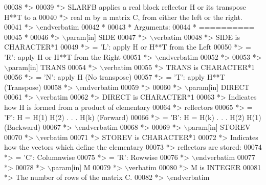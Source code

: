 \begin{DoxyCode}
00038 \textcolor{comment}{*>}
00039 \textcolor{comment}{*> SLARFB applies a real block reflector H or its transpose H**T to a}
00040 \textcolor{comment}{*> real m by n matrix C, from either the left or the right.}
00041 \textcolor{comment}{*> \(\backslash\)endverbatim}
00042 \textcolor{comment}{*}
00043 \textcolor{comment}{*  Arguments:}
00044 \textcolor{comment}{*  ==========}
00045 \textcolor{comment}{*}
00046 \textcolor{comment}{*> \(\backslash\)param[in] SIDE}
00047 \textcolor{comment}{*> \(\backslash\)verbatim}
00048 \textcolor{comment}{*>          SIDE is CHARACTER*1}
00049 \textcolor{comment}{*>          = 'L': apply H or H**T from the Left}
00050 \textcolor{comment}{*>          = 'R': apply H or H**T from the Right}
00051 \textcolor{comment}{*> \(\backslash\)endverbatim}
00052 \textcolor{comment}{*>}
00053 \textcolor{comment}{*> \(\backslash\)param[in] TRANS}
00054 \textcolor{comment}{*> \(\backslash\)verbatim}
00055 \textcolor{comment}{*>          TRANS is CHARACTER*1}
00056 \textcolor{comment}{*>          = 'N': apply H (No transpose)}
00057 \textcolor{comment}{*>          = 'T': apply H**T (Transpose)}
00058 \textcolor{comment}{*> \(\backslash\)endverbatim}
00059 \textcolor{comment}{*>}
00060 \textcolor{comment}{*> \(\backslash\)param[in] DIRECT}
00061 \textcolor{comment}{*> \(\backslash\)verbatim}
00062 \textcolor{comment}{*>          DIRECT is CHARACTER*1}
00063 \textcolor{comment}{*>          Indicates how H is formed from a product of elementary}
00064 \textcolor{comment}{*>          reflectors}
00065 \textcolor{comment}{*>          = 'F': H = H(1) H(2) . . . H(k) (Forward)}
00066 \textcolor{comment}{*>          = 'B': H = H(k) . . . H(2) H(1) (Backward)}
00067 \textcolor{comment}{*> \(\backslash\)endverbatim}
00068 \textcolor{comment}{*>}
00069 \textcolor{comment}{*> \(\backslash\)param[in] STOREV}
00070 \textcolor{comment}{*> \(\backslash\)verbatim}
00071 \textcolor{comment}{*>          STOREV is CHARACTER*1}
00072 \textcolor{comment}{*>          Indicates how the vectors which define the elementary}
00073 \textcolor{comment}{*>          reflectors are stored:}
00074 \textcolor{comment}{*>          = 'C': Columnwise}
00075 \textcolor{comment}{*>          = 'R': Rowwise}
00076 \textcolor{comment}{*> \(\backslash\)endverbatim}
00077 \textcolor{comment}{*>}
00078 \textcolor{comment}{*> \(\backslash\)param[in] M}
00079 \textcolor{comment}{*> \(\backslash\)verbatim}
00080 \textcolor{comment}{*>          M is INTEGER}
00081 \textcolor{comment}{*>          The number of rows of the matrix C.}
00082 \textcolor{comment}{*> \(\backslash\)endverbatim}

\end{DoxyCode}
